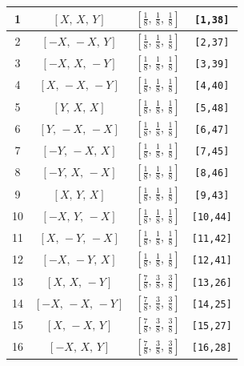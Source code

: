 \documentclass[fleqn,8pt]{jsarticle}
\begin{document}
\begin{longtable}{cccc}
1 & $\left[ X,\, X,\, Y \right]$ & $\left[ \frac{1}{8},\, \frac{1}{8},\, \frac{1}{8} \right]$ & {\tt [1,38]} \\ \hline
2 & $\left[ - X,\, - X,\, Y \right]$ & $\left[ \frac{1}{8},\, \frac{1}{8},\, \frac{1}{8} \right]$ & {\tt [2,37]} \\ \hline
3 & $\left[ - X,\, X,\, - Y \right]$ & $\left[ \frac{1}{8},\, \frac{1}{8},\, \frac{1}{8} \right]$ & {\tt [3,39]} \\ \hline
4 & $\left[ X,\, - X,\, - Y \right]$ & $\left[ \frac{1}{8},\, \frac{1}{8},\, \frac{1}{8} \right]$ & {\tt [4,40]} \\ \hline
5 & $\left[ Y,\, X,\, X \right]$ & $\left[ \frac{1}{8},\, \frac{1}{8},\, \frac{1}{8} \right]$ & {\tt [5,48]} \\ \hline
6 & $\left[ Y,\, - X,\, - X \right]$ & $\left[ \frac{1}{8},\, \frac{1}{8},\, \frac{1}{8} \right]$ & {\tt [6,47]} \\ \hline
7 & $\left[ - Y,\, - X,\, X \right]$ & $\left[ \frac{1}{8},\, \frac{1}{8},\, \frac{1}{8} \right]$ & {\tt [7,45]} \\ \hline
8 & $\left[ - Y,\, X,\, - X \right]$ & $\left[ \frac{1}{8},\, \frac{1}{8},\, \frac{1}{8} \right]$ & {\tt [8,46]} \\ \hline
9 & $\left[ X,\, Y,\, X \right]$ & $\left[ \frac{1}{8},\, \frac{1}{8},\, \frac{1}{8} \right]$ & {\tt [9,43]} \\ \hline
10 & $\left[ - X,\, Y,\, - X \right]$ & $\left[ \frac{1}{8},\, \frac{1}{8},\, \frac{1}{8} \right]$ & {\tt [10,44]} \\ \hline
11 & $\left[ X,\, - Y,\, - X \right]$ & $\left[ \frac{1}{8},\, \frac{1}{8},\, \frac{1}{8} \right]$ & {\tt [11,42]} \\ \hline
12 & $\left[ - X,\, - Y,\, X \right]$ & $\left[ \frac{1}{8},\, \frac{1}{8},\, \frac{1}{8} \right]$ & {\tt [12,41]} \\ \hline
13 & $\left[ X,\, X,\, - Y \right]$ & $\left[ \frac{7}{8},\, \frac{3}{8},\, \frac{3}{8} \right]$ & {\tt [13,26]} \\ \hline
14 & $\left[ - X,\, - X,\, - Y \right]$ & $\left[ \frac{7}{8},\, \frac{3}{8},\, \frac{3}{8} \right]$ & {\tt [14,25]} \\ \hline
15 & $\left[ X,\, - X,\, Y \right]$ & $\left[ \frac{7}{8},\, \frac{3}{8},\, \frac{3}{8} \right]$ & {\tt [15,27]} \\ \hline
16 & $\left[ - X,\, X,\, Y \right]$ & $\left[ \frac{7}{8},\, \frac{3}{8},\, \frac{3}{8} \right]$ & {\tt [16,28]} \\ \hline

\end{longtable}
\end{document}
